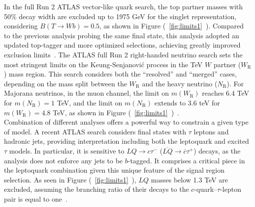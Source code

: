 \documentclass{moriond}
\begin{document}
In the full Run 2 ATLAS vector-like quark search, the top partner masses with
50\% decay width are excluded up to 1975 GeV for the singlet representation,
considering $B(T\rightarrow Wb)=0.5$, as shown in
Figure (~\ref{fig:limits1}~). Compared to the previous analysis
probing the same final state, this analysis adopted an updated top-tagger and
more optimized selections, achieving greatly improved exclusion limits~\cite{vlq}. The
ATLAS full Run 2 right-handed neutrino search sets the most stringent limits on
the Keung-Senjanović process in the TeV $W$ partner ($W_{\mathrm{R}}$) mass
region. This search considers both the ``resolved'' and ``merged'' cases,
depending on the mass split between the $W_{\mathrm{R}}$ and the heavy neutrino
($N_{\mathrm{R}}$). For Majorana neutrinos, in the muon channel, the limit on
$m(W_{\mathrm{R}})$ reaches 6.4 TeV for $m(N_{\mathrm{R}})=1$ TeV, and the
limit on $m(N_{\mathrm{R}})$ extends to 3.6 teV for $m(W_{\mathrm{R}})=4.8$
TeV, as shown in Figure (~\ref{fig:limits1}~)~\cite{rhn}.\\           

Combination of different analyses offers a powerful way to constrain a given
type of model. A recent ATLAS search considers final states with $\tau$ leptons
and hadronic jets, providing interpretation including both the leptoquark and
excited $\tau$ models. In particular, it is sensitive to $LQ\rightarrow
c\tau^{-}$ ($\overline{LQ}\rightarrow\overline{c}\tau^{+}$) decays, as the
analysis does not enforce any jets to be $b$-tagged. It comprises a critical
piece in the leptoquark combination given this unique feature of the signal
region selection. As seen in Figure (~\ref{fig:limits1}~),
$LQ$ masses below 1.3 TeV are excluded, assuming the branching ratio of their
decays to the $c$-quark–$\tau$-lepton pair is equal to one~\cite{tau}.\\   

\clearpage
\end{document}
